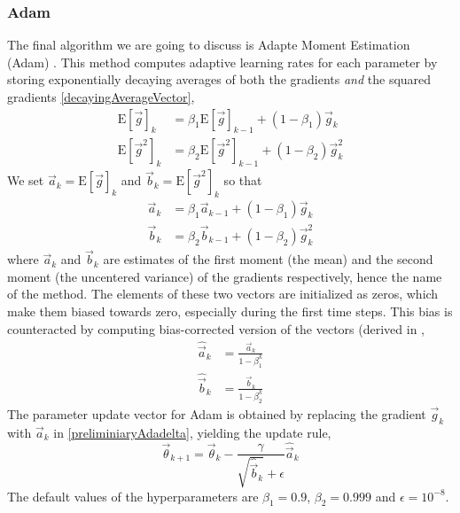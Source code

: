 \documentclass[twoside,english]{uiofysmaster}
\begin{document}
\subsubsection{Adam}
The final algorithm we are going to discuss is Adapte Moment Estimation (Adam) \cite{Kingma14}. This method
computes adaptive learning rates for each parameter by storing 
exponentially decaying averages of both the gradients \textit{and} 
the squared gradients \eqref{decayingAverageVector},
\begin{equation}
 \begin{aligned}
  \mathrm{E}[\vec{g}]_k &= \beta_1 \mathrm{E}[\vec{g}]_{k-1} + (1 - \beta_1) \vec{g}_k \\
  \mathrm{E}[\vec{g}^2]_k &= \beta_2  \mathrm{E}[\vec{g}^2]_{k-1} + (1 - \beta_2) \vec{g}^2_k
 \end{aligned}
\end{equation}
We set $\vec{a}_k = \mathrm{E}[\vec{g}]_k$ and $\vec{b}_k = \mathrm{E}[\vec{g}^2]_k$ so that
\begin{equation}
 \begin{aligned}
 \vec{a}_k &= \beta_1 \vec{a}_{k-1} + (1 - \beta_1) \vec{g}_k \\
 \vec{b}_k &= \beta_2 \vec{b}_{k-1} + (1 - \beta_2) \vec{g}^2_k
 \end{aligned}
\end{equation}
where $\vec{a}_k$ and $\vec{b}_k$ are estimates of the first moment (the mean) and the second moment (the uncentered variance)
of the gradients respectively, hence the name of the method. The elements of these two vectors are initialized as zeros, 
which make them biased towards zero, especially during the first time steps. This bias is counteracted by
computing bias-corrected version of the vectors (derived in \cite{Kingma14},
\begin{equation}
 \begin{aligned}
 \hat{\vec{a}}_k &= \frac{\vec{a}_k}{1 - \beta_1^k} \\
 \hat{\vec{b}}_k &= \frac{\vec{b}_k}{1 - \beta_2^k}
 \end{aligned}
\end{equation}
The parameter update vector for Adam is obtained by replacing the gradient $\vec{g}_k$ with $\vec{a}_k$ in \eqref{preliminiaryAdadelta},
yielding the update rule,
\begin{equation}
 \vec{\theta}_{k+1} = \vec{\theta}_k - \frac{\gamma}{\sqrt{\hat{\vec{b}}_k} + \epsilon} \hat{\vec{a}}_k
\end{equation}
The default values of the hyperparameters are $\beta_1 = 0.9$, $\beta_2 = 0.999$ and $\epsilon = 10^{-8}$. 
\end{document}
